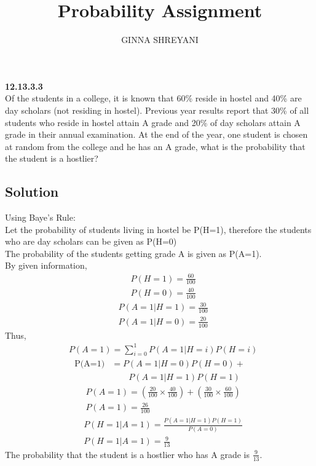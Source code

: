 \documentclass[10pt,twocolumn]{article}
\title{
Probability Assignment
}
\author{GINNA SHREYANI}
\date{}
\begin{document}
\maketitle
\textbf{12.13.3.3}\\
Of the students in a college, it is known that 60\% reside in hostel and 40\% are day scholars (not residing in hostel). Previous year results report that 30\% of all students who reside in hostel attain A grade and 20\% of day scholars attain A grade in their annual examination. At the end of the year, one student is chosen at random from the college and he has an A grade, what is the probability that the student is a hostlier?
\subsection*{Solution}
Using Baye's Rule:\\
Let the probability of students living in hostel be P(H=1), therefore the students who are day scholars can be given as P(H=0)\\
The probability of the students getting grade A is given as P(A=1).\\
By given information,
\begin{align}
	&P(H=1) = \frac{60}{100}
	\label{eq-1}
\end{align}
\begin{align}
	&P(H=0) = \frac{40}{100}
	\label{eq-2}
\end{align}
\begin{align}
	&P(A=1|H=1) = \frac{30}{100}
	\label{eq-3}
\end{align}
\begin{align}
	&P(A=1|H=0) = \frac{20}{100}
	\label{eq-4}
\end{align}
Thus,
\begin{align}
	&P(A=1) = \sum_{i=0}^1 P(A = 1|H = i)P(H=i)
	\label{eq-5}
\end{align}
\begin{align*}
	\text{P(A=1)}
	&= P(A = 1|H = 0)P(H = 0)+\\
	&\qquad P(A = 1|H = 1)P(H = 1)
	\label{eq-6}
\end{align*}
\begin{align}
	&P(A=1) = \left(\frac{20}{100} \times \frac{40}{100}\right)+\left(\frac{30}{100} \times \frac{60}{100}\right)\\
	&P(A=1) = \frac{26}{100}
\end{align}
\begin{align}
	&P(H=1|A=1) = \frac{P(A=1|H=1)P(H=1)}{P(A=0)}\\
	&P(H=1|A=1) = \frac{9}{13}
\end{align}
The probability that the student is a hostlier who has A grade is $\frac{9}{13}$.\\
\end{document}
